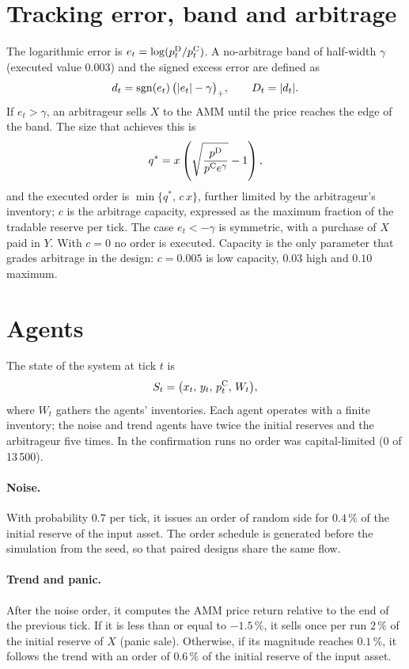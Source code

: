 \section{Tracking error, band and arbitrage}

The logarithmic error is $e_t=\log(p^{\mathrm{D}}_t/p^{\mathrm{C}}_t)$. A no-arbitrage band of half-width $\gamma$ (executed value $0.003$) and the signed excess error are defined as
\begin{equation}
  d_t = \operatorname{sgn}(e_t)\,\bigl(|e_t|-\gamma\bigr)_+ ,\qquad D_t=|d_t|.
  \label{eq:exceso}
\end{equation}
If $e_t>\gamma$, an arbitrageur sells $X$ to the AMM until the price reaches the edge of the band. The size that achieves this is
\begin{equation}
  q^{\ast} = x\left(\sqrt{\frac{p^{\mathrm{D}}}{p^{\mathrm{C}} e^{\gamma}}}-1\right),
  \label{eq:qstar}
\end{equation}
and the executed order is $\min\{q^{\ast},\,c\,x\}$, further limited by the arbitrageur's inventory; $c$ is the arbitrage capacity, expressed as the maximum fraction of the tradable reserve per tick. The case $e_t<-\gamma$ is symmetric, with a purchase of $X$ paid in $Y$. With $c=0$ no order is executed. Capacity is the only parameter that grades arbitrage in the design: $c=0.005$ is low capacity, $0.03$ high and $0.10$ maximum.

\section{Agents}

The state of the system at tick $t$ is
\begin{equation}
  S_t = \bigl(x_t,\,y_t,\,p^{\mathrm{C}}_t,\,W_t\bigr),
  \label{eq:estado}
\end{equation}
where $W_t$ gathers the agents' inventories. Each agent operates with a finite inventory; the noise and trend agents have twice the initial reserves and the arbitrageur five times. In the confirmation runs no order was capital-limited (0 of 13\,500).

\paragraph{Noise.} With probability $0.7$ per tick, it issues an order of random side for $0.4\,\%$ of the initial reserve of the input asset. The order schedule is generated before the simulation from the seed, so that paired designs share the same flow.

\paragraph{Trend and panic.} After the noise order, it computes the AMM price return relative to the end of the previous tick. If it is less than or equal to $-1.5\,\%$, it sells once per run $2\,\%$ of the initial reserve of $X$ (panic sale). Otherwise, if its magnitude reaches $0.1\,\%$, it follows the trend with an order of $0.6\,\%$ of the initial reserve of the input asset.

